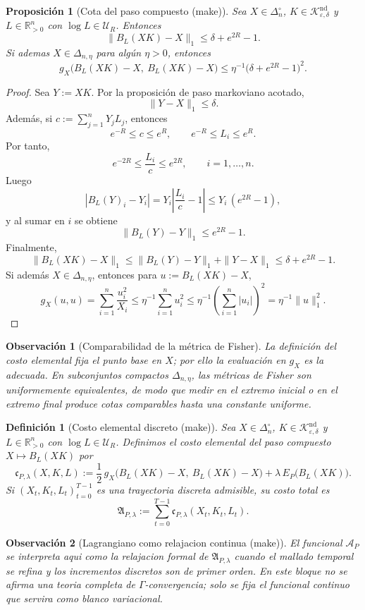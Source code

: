 ﻿\documentclass[12pt]{article}
\newcommand{\fuente}[1]{\textnormal{(#1)}}
\newtheorem{definicion}{Definición}[section]
\newtheorem{proposicion}{Proposición}[section]
\newtheorem{observacion}{Observación}[section]
\begin{document}
\begin{proposicion}[Cota del paso compuesto \fuente{make}]
Sea \(X\in\Delta_n^\circ\), \(K\in\mathcal K_{\varepsilon,\delta}^{\mathrm{nd}}\) y \(L\in\mathbb R_{>0}^n\) con \(\log L\in\mathcal U_R\). Entonces
\[
\|B_L(XK)-X\|_1\le \delta + e^{2R}-1.
\]
Si ademas \(X\in\Delta_{n,\eta}\) para algún \(\eta>0\), entonces
\[
g_X\bigl(B_L(XK)-X,\ B_L(XK)-X\bigr)\le \eta^{-1}\bigl(\delta + e^{2R}-1\bigr)^2.
\]
\end{proposicion}
\begin{proof}
Sea \(Y:=XK\). Por la proposición de paso markoviano acotado,
\[
\|Y-X\|_1\le \delta.
\]
Además, si \(c:=\sum_{j=1}^n Y_jL_j\), entonces
\[
e^{-R}\le c\le e^R,
\qquad
e^{-R}\le L_i\le e^R.
\]
Por tanto,
\[
e^{-2R}\le \frac{L_i}{c}\le e^{2R},
\qquad i=1,\dots,n.
\]
Luego
\[
|B_L(Y)_i-Y_i|
=Y_i\left|\frac{L_i}{c}-1\right|
\le Y_i\,(e^{2R}-1),
\]
y al sumar en \(i\) se obtiene
\[
\|B_L(Y)-Y\|_1\le e^{2R}-1.
\]
Finalmente,
\[
\|B_L(XK)-X\|_1
\le \|B_L(Y)-Y\|_1+\|Y-X\|_1
\le \delta+e^{2R}-1.
\]
Si además \(X\in\Delta_{n,\eta}\), entonces para \(u:=B_L(XK)-X\),
\[
g_X(u,u)=\sum_{i=1}^n \frac{u_i^2}{X_i}
\le \eta^{-1}\sum_{i=1}^n u_i^2
\le \eta^{-1}\left(\sum_{i=1}^n |u_i|\right)^2
=\eta^{-1}\|u\|_1^2.
\]
\end{proof}

\begin{observacion}[Comparabilidad de la métrica de Fisher]
La definición del costo elemental fija el punto base en \(X\); por ello la evaluación en \(g_X\) es la adecuada. En subconjuntos compactos \(\Delta_{n,\eta}\), las métricas de Fisher son uniformemente equivalentes, de modo que medir en el extremo inicial o en el extremo final produce cotas comparables hasta una constante uniforme.
\end{observacion}
\begin{definicion}[Costo elemental discreto \fuente{make}]
Sea \(X\in\Delta_n^\circ\), \(K\in\mathcal K_{\varepsilon,\delta}^{\mathrm{nd}}\) y \(L\in\mathbb R_{>0}^n\) con \(\log L\in\mathcal U_R\). Definimos el costo elemental del paso compuesto \(X\mapsto B_L(XK)\) por
\[
\mathfrak c_{P,\lambda}(X,K,L):=\frac12\,g_X\bigl(B_L(XK)-X,\ B_L(XK)-X\bigr)+\lambda\,E_P\bigl(B_L(XK)\bigr).
\]
Si \((X_t,K_t,L_t)_{t=0}^{T-1}\) es una trayectoria discreta admisible, su costo total es
\[
\mathfrak A_{P,\lambda}:=\sum_{t=0}^{T-1}\mathfrak c_{P,\lambda}(X_t,K_t,L_t).
\]
\end{definicion}

\begin{observacion}[Lagrangiano como relajacion continua \fuente{make}]
El funcional \(\mathcal A_P\) se interpreta aqui como la relajacion formal de \(\mathfrak A_{P,\lambda}\) cuando el mallado temporal se refina y los incrementos discretos son de primer orden. En este bloque no se afirma una teoria completa de \(\Gamma\)-convergencia; solo se fija el funcional continuo que servira como blanco variacional.
\end{observacion}
\end{document}
